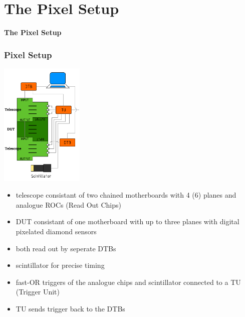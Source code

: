 \documentclass[9pt]{beamer}
\begin{document}
\section{The Pixel Setup}
\begin{frame}
	\begin{alertblock}{
		\begin{center}
			\Large{\textbf{The Pixel Setup}}
		\end{center}}
	\end{alertblock}
\end{frame}
\begin{frame}
	\frametitle{Pixel Setup}
	\begin{center}
		\begin{minipage}{4.5cm}
			\centering
			\includegraphics[width=4.0cm]{Pics/fulltel_scint}
		\end{minipage}
		\hspace*{2pt}
		\begin{minipage}{6cm}
			\begin{itemize}
				\item telescope consistant of two chained motherboards with 4 (6) planes and analogue ROCs (Read Out Chips)
				\item DUT consistant of one motherboard with up to three planes with digital pixelated diamond sensors
				\item both read out by seperate DTBs
				\item scintillator for precise timing
				\item fast-OR triggers of the analogue chips and scintillator connected to a TU (Trigger Unit) 
				\item TU sends trigger back to the DTBs
			\end{itemize}
		\end{minipage}\no\s
	\end{center}
\end{frame}
\end{document}

